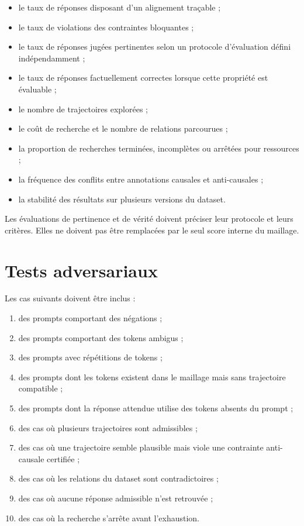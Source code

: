 \documentclass[11pt,a4paper,oneside]{book}
\theoremstyle{remark}
\begin{document}
\begin{itemize}
  \item le taux de réponses disposant d'un alignement traçable ;
  \item le taux de violations des contraintes bloquantes ;
  \item le taux de réponses jugées pertinentes selon un protocole
        d'évaluation défini indépendamment ;
  \item le taux de réponses factuellement correctes lorsque cette
        propriété est évaluable ;
  \item le nombre de trajectoires explorées ;
  \item le coût de recherche et le nombre de relations parcourues ;
  \item la proportion de recherches terminées, incomplètes ou arrêtées
        pour ressources ;
  \item la fréquence des conflits entre annotations causales
        et anti-causales ;
  \item la stabilité des résultats sur plusieurs versions du dataset.
\end{itemize}

Les évaluations de pertinence et de vérité doivent préciser leur
protocole et leurs critères. Elles ne doivent pas être remplacées
par le seul score interne du maillage.

\section{Tests adversariaux}

Les cas suivants doivent être inclus :

\begin{enumerate}
  \item des prompts comportant des négations ;
  \item des prompts comportant des tokens ambigus ;
  \item des prompts avec répétitions de tokens ;
  \item des prompts dont les tokens existent dans le maillage
        mais sans trajectoire compatible ;
  \item des prompts dont la réponse attendue utilise des tokens
        absents du prompt ;
  \item des cas où plusieurs trajectoires sont admissibles ;
  \item des cas où une trajectoire semble plausible mais viole
        une contrainte anti-causale certifiée ;
  \item des cas où les relations du dataset sont contradictoires ;
  \item des cas où aucune réponse admissible n'est retrouvée ;
  \item des cas où la recherche s'arrête avant l'exhaustion.
\end{enumerate}
\end{document}
